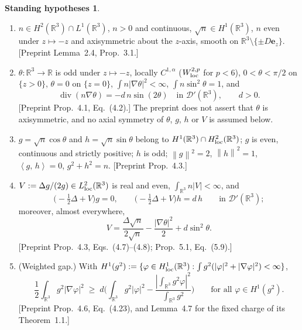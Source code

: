 \documentclass[11pt,a4paper]{article}
\theoremstyle{plain}
\theoremstyle{definition}
\newtheorem{hypotheses}[theorem]{Standing hypotheses}
\theoremstyle{remark}
\newcommand{\R}{\mathbb{R}}
\newcommand{\norm}[1]{\left\|#1\right\|}
\newcommand{\ip}[2]{\left\langle #1,\,#2\right\rangle}
\DeclareMathOperator{\divg}{div}
\begin{document}
\begin{hypotheses}\label{hyp}
\begin{enumerate}
\item[(H1)] $n\in H^2(\R^3)\cap L^1(\R^3)$, $n>0$ and continuous, $\sqrt n\in H^1(\R^3)$, $n$ even under $z\mapsto-z$ and axisymmetric about the $z$-axis, smooth on $\R^3\setminus\{\pm D\mathbf e_z\}$. [Preprint Lemma~2.4, Prop.~3.1.]
\item[(H2)] $\theta\colon\R^3\to\R$ is odd under $z\mapsto-z$, locally $C^{1,\alpha}$ ($W^{2,p}_{\rm loc}$ for $p<6$), $0<\theta<\pi/2$ on $\{z>0\}$, $\theta=0$ on $\{z=0\}$, $\int n|\nabla\theta|^2<\infty$, $\int n\sin^2\theta=1$, and
\[
\divg(n\nabla\theta)=-d\,n\sin(2\theta)\quad\text{in }\mathcal D'(\R^3),\qquad d>0 .
\]
[Preprint Prop.~4.1, Eq.~(4.2).] The preprint does not assert that $\theta$ is axisymmetric, and no axial symmetry of $\theta$, $g$, $h$ or $V$ is assumed below.
\item[(H3)] $g=\sqrt n\cos\theta$ and $h=\sqrt n\sin\theta$ belong to $H^1(\R^3)\cap H^2_{\rm loc}(\R^3)$; $g$ is even, continuous and strictly positive; $h$ is odd; $\norm g^2=2$, $\norm h^2=1$, $\ip gh=0$, $g^2+h^2=n$. [Preprint Prop.~4.3.]
\item[(H4)] $V:=\Delta g/(2g)\in L^2_{\rm loc}(\R^3)$ is real and even, $\int_{\R^3}n|V|<\infty$, and
\[
\big(-\tfrac12\Delta+V\big)g=0,\qquad \big(-\tfrac12\Delta+V\big)h=d\,h\qquad\text{in }\mathcal D'(\R^3);
\]
moreover, almost everywhere,
\begin{equation}\label{eq:Vformula}
V=\frac{\Delta\sqrt n}{2\sqrt n}-\frac{|\nabla\theta|^2}{2}+d\sin^2\theta .
\end{equation}
[Preprint Prop.~4.3, Eqs.~(4.7)--(4.8); Prop.~5.1, Eq.~(5.9).]
\item[(H5)] (Weighted gap.) With $H^1(g^2):=\{\varphi\in H^1_{\rm loc}(\R^3):\int g^2(|\varphi|^2+|\nabla\varphi|^2)<\infty\}$,
\begin{equation}\label{eq:gap}
\frac12\int_{\R^3}g^2|\nabla\varphi|^2\;\ge\;d\Big(\int_{\R^3}g^2|\varphi|^2-\frac{|\int_{\R^3}g^2\varphi|^2}{\int_{\R^3}g^2}\Big)\qquad\text{for all }\varphi\in H^1(g^2).
\end{equation}
[Preprint Prop.~4.6, Eq.~(4.23), and Lemma~4.7 for the fixed charge of its Theorem~1.1.]
\end{enumerate}
\end{hypotheses}
\end{document}
